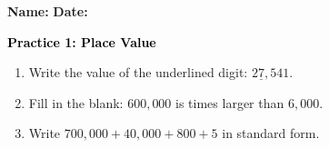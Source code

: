 \documentclass[12pt, letterpaper, fleqn]{article}
\newcommand{\blank}{\underline{\hspace{2.2cm}}}
\begin{document}
\textbf{Name:} \underline{\hspace{5cm}}
\hfill
\textbf{Date:} \underline{\hspace{3cm}}\\

\begin{tcolorbox}[colback=customteal!20]
    \large\textcolor{black}{\textbf{Practice 1: Place Value}}
\end{tcolorbox}
\begin{enumerate}[itemsep=3.5cm, leftmargin=0.6cm]
\item Write the value of the underlined digit: $2\underline{7},541$.
\vspace{3cm}
\item Fill in the blank: $600,000$ is \blank times larger than $6,000$.
\vspace{3cm}
\item Write $700,000 + 40,000 + 800 + 5$ in standard form.
\end{enumerate}
\end{document}
